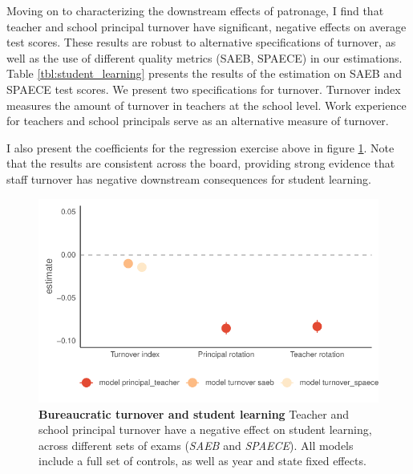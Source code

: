 Moving on to characterizing the downstream effects of patronage, I find that teacher and school principal turnover have significant, negative effects on average test scores. These results are robust to alternative specifications of turnover, as well as the use of different quality metrics (SAEB, SPAECE) in our estimations. Table \ref{tbl:student_learning} presents the results of the estimation on SAEB and SPAECE test scores. We present two specifications for turnover. Turnover index measures the amount of turnover in teachers at the school level. Work experience for teachers and school principals serve as an alternative measure of turnover.

\begin{landscape}
    \begin{table}[t]
      \centering
      \footnotesize
      
      \caption{{\bf Bureaucratic turnover and student learning} Teacher and school principal turnover have a negative effect on student learning. Models 1 and 2 present results for teacher turnover index constructed at the school level. Models 3 and 4 estimate the effect of new teachers and school principals entering the school (less than two years). All models include year and state fixed effects.}
      \label{tbl:student_learning}
    \end{table}
\end{landscape}

I also present the coefficients for the regression exercise above in figure \ref{fig:hlm_mods}. Note that the results are consistent across the board, providing strong evidence that staff turnover has negative downstream consequences for student learning.

\begin{figure}[h]
  \centering
  \includegraphics[width=0.6\linewidth]{chapters/chapter_1/plots/model_turnover_learning.pdf}
  \caption{{\bf Bureaucratic turnover and student learning} Teacher and school principal turnover have a negative effect on student learning, across different sets of exams (\emph{SAEB} and \emph{SPAECE}). All models include a full set of controls, as well as year and state fixed effects.}
  \label{fig:hlm_mods}
\end{figure}

